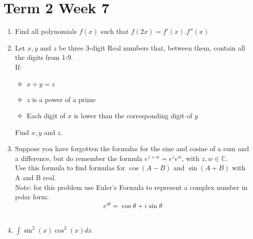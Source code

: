 \documentclass[../main.tex]{subfiles}
\begin{document}
\section*{Term 2 Week 7}
\begin{enumerate}
    \item 
    Find all polynomials \(f(x)\) such that \(f(2x)=f'(x).f''(x)\)\\

    \item 
    Let \(x, y \text{ and } z\) be three 3-digit Real numbers that, between them, contain all the digits from 1-9.\\
    If:
    \begin{itemize}
        \item 
            \(x+y=z\)
        \item 
            \(z\) is a power of a prime
        \item 
            Each digit of \(x\) is lower than the corresponding digit of \(y\)
    \end{itemize}
    Find \(x, y\) and \(z\).\\

    \item
    Suppose you have forgotten the formulas for the sine and cosine of a sum and a difference, but do remember the formula \(e^{z+w}=e^z e^w\), with \(z, w \in \mathbb{C} \).\\
    Use this formula to find formulas for \(\cos{(A-B)}\) and \(\sin{(A+B)}\) with A and B real.\\

    Note: for this problem use Euler's Formula to represent a complex number in polar form:\\
    \[e^{i\theta}=\cos{\theta}+i\sin{\theta}\]\\

    \item 
    \(\int \sin^2{(x)}\cos^2{(x)} dx\)
    
    \end{enumerate}
\end{document}

